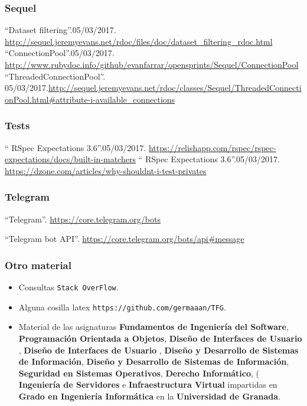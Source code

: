 \documentclass[a4paper,11pt]{book}
\begin{document}
\begin{thebibliography}{99}
\subsubsection*{Sequel}

 ``Dataset filtering''.05/03/2017. \url{http://sequel.jeremyevans.net/rdoc/files/doc/dataset_filtering_rdoc.html}
 ``ConnectionPool''.05/03/2017. \url{http://www.rubydoc.info/github/evanfarrar/opensprints/Sequel/ConnectionPool}
 ``ThreadedConnectionPool''. 05/03/2017.\url{http://sequel.jeremyevans.net/rdoc/classes/Sequel/ThreadedConnectionPool.html#attribute-i-available_connections
}
\subsubsection*{Tests}

 `` RSpec Expectations 3.6''.05/03/2017. \url{https://relishapp.com/rspec/rspec-expectations/docs/built-in-matchers}
 `` RSpec Expectations 3.6''.05/03/2017. \url{https://dzone.com/articles/why-shouldnt-i-test-privates}

\subsubsection*{Telegram}
 ``Telegram''. \url{https://core.telegram.org/bots}

 ``Telegram bot API''. \url{https://core.telegram.org/bots/api#message}



\bigskip
\subsubsection*{Otro material}
\begin{itemize}
	\item Consultas {\tt Stack OverFlow}.
	\item Alguna cosilla latex {\tt https://github.com/germaaan/TFG}.
	\item Material de las asignaturas \textbf{Fundamentos de Ingeniería del Software}, \textbf{Programación Orientada a Objetos}, \textbf{Diseño de Interfaces de Usuario  }, \textbf{Diseño de Interfaces de Usuario  }, \textbf{Diseño y Desarrollo de Sistemas de Información}, \textbf{Diseño y Desarrollo de Sistemas de Información}, \textbf{Seguridad en Sistemas Operativos}, \textbf{Derecho Informático},  ( \textbf{Ingeniería de Servidores} e \textbf{Infraestructura Virtual} impartidas en \textbf{Grado en Ingeniería Informática} en la \textbf{Universidad de Granada}.
\end{itemize}
\end{thebibliography}
\end{document}
